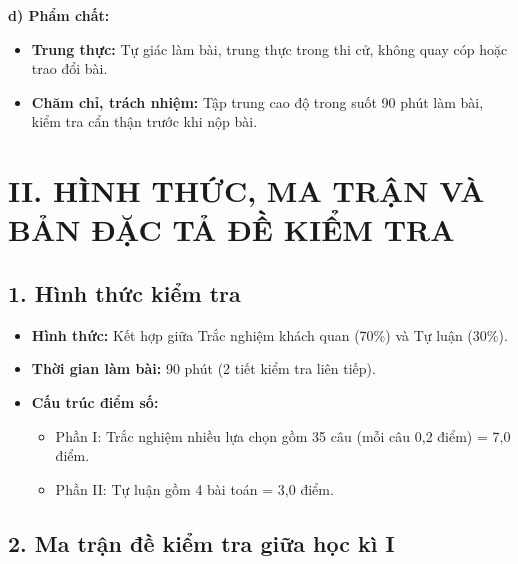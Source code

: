 \documentclass[12pt, a4paper]{article}
\begin{document}
\textbf{d) Phẩm chất:}
\begin{itemize}[leftmargin=1.5em]
    \item \textbf{Trung thực:} Tự giác làm bài, trung thực trong thi cử, không quay cóp hoặc trao đổi bài.
    \item \textbf{Chăm chỉ, trách nhiệm:} Tập trung cao độ trong suốt 90 phút làm bài, kiểm tra cẩn thận trước khi nộp bài.
\end{itemize}

\section*{II. HÌNH THỨC, MA TRẬN VÀ BẢN ĐẶC TẢ ĐỀ KIỂM TRA}

\subsection*{1. Hình thức kiểm tra}
\begin{itemize}[leftmargin=1.5em]
    \item \textbf{Hình thức:} Kết hợp giữa Trắc nghiệm khách quan (70\%) và Tự luận (30\%).
    \item \textbf{Thời gian làm bài:} 90 phút (2 tiết kiểm tra liên tiếp).
    \item \textbf{Cấu trúc điểm số:}
    \begin{itemize}
        \item Phần I: Trắc nghiệm nhiều lựa chọn gồm 35 câu (mỗi câu 0,2 điểm) = 7,0 điểm.
        \item Phần II: Tự luận gồm 4 bài toán = 3,0 điểm.
    \end{itemize}
\end{itemize}

\subsection*{2. Ma trận đề kiểm tra giữa học kì I}
\end{document}
